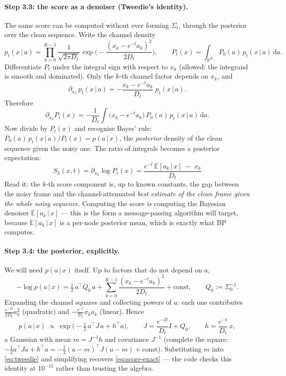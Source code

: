 \documentclass[11pt]{article}
\theoremstyle{definition}
\theoremstyle{remark}
\newcommand{\R}{\mathbb{R}}
\newcommand{\E}{\mathbb{E}}
\newcommand{\dd}{\mathrm{d}}
\newcommand{\T}{^{\!\top}}
\newcommand{\given}{\,|\,}
\begin{document}
\paragraph{Step 3.3: the score as a denoiser (Tweedie's identity).}
\label{step:tweedie}
The same score can be computed without ever forming $\Sigma_t$, through the
posterior over the clean sequence. Write the channel density
\[
  p_t(x\given a)=\prod_{k=0}^{K-1}
  \frac{1}{\sqrt{2\pi D_t}}\exp\!\Big(-\frac{(x_k-e^{-t}a_k)^2}{2D_t}\Big),
  \qquad
  P_t(x)=\int_{\R^K}P_0(a)\,p_t(x\given a)\,\dd a .
\]
Differentiate $P_t$ under the integral sign with respect to $x_k$ (allowed:
the integrand is smooth and dominated). Only the $k$-th channel factor
depends on $x_k$, and
\[
  \partial_{x_k}\,p_t(x\given a)
  =-\frac{x_k-e^{-t}a_k}{D_t}\;p_t(x\given a) .
\]
Therefore
\[
  \partial_{x_k}P_t(x)
  =-\frac1{D_t}\int\big(x_k-e^{-t}a_k\big)\,P_0(a)\,p_t(x\given a)\,\dd a .
\]
Now divide by $P_t(x)$ and recognise Bayes' rule:
$P_0(a)\,p_t(x\given a)/P_t(x)=p(a\given x)$, the \emph{posterior} density
of the clean sequence given the noisy one. The ratio of integrals becomes a
posterior expectation:
\begin{equation}\label{eq:tweedie}
  \boxed{\;S_k(x,t)=\partial_{x_k}\log P_t(x)
  =\frac{e^{-t}\,\E[a_k\given x]\;-\;x_k}{D_t}\;}
\end{equation}
Read it: the $k$-th score component is, up to known constants, the gap
between the noisy frame and the channel-attenuated \emph{best estimate of
the clean frame given the whole noisy sequence}. Computing the score
\emph{is} computing the Bayesian denoiser $\E[a_k\given x]$ --- this is the
form a message-passing algorithm will target, because $\E[a_k\given x]$ is
a per-node posterior mean, which is exactly what BP computes.

\paragraph{Step 3.4: the posterior, explicitly.}\label{step:posterior}
We will need $p(a\given x)$ itself. Up to factors that do not depend on
$a$,
\[
  -\log p(a\given x)
  =\tfrac12\,a\T Q_0\,a
  +\sum_{k=0}^{K-1}\frac{(x_k-e^{-t}a_k)^2}{2D_t}
  +\text{const},
  \qquad Q_0:=\Sigma_0^{-1}.
\]
Expanding the channel squares and collecting powers of $a$: each one
contributes $\frac{e^{-2t}}{2D_t}a_k^2$ (quadratic) and
$-\frac{e^{-t}}{D_t}x_ka_k$ (linear). Hence
\begin{equation}\label{eq:posterior}
  p(a\given x)\ \propto\
  \exp\!\Big(-\tfrac12\,a\T J\,a+h\T a\Big),
  \qquad
  J=\frac{e^{-2t}}{D_t}I+Q_0,
  \qquad
  h=\frac{e^{-t}}{D_t}\,x ,
\end{equation}
a Gaussian with mean $m=J^{-1}h$ and covariance $J^{-1}$ (complete the
square: $-\tfrac12a\T Ja+h\T a=-\tfrac12(a-m)\T J(a-m)+\text{const}$).
Substituting $m$ into \eqref{eq:tweedie} and simplifying recovers
\eqref{eq:score-exact} --- the code checks this identity at $10^{-15}$
rather than trusting the algebra.
\end{document}
